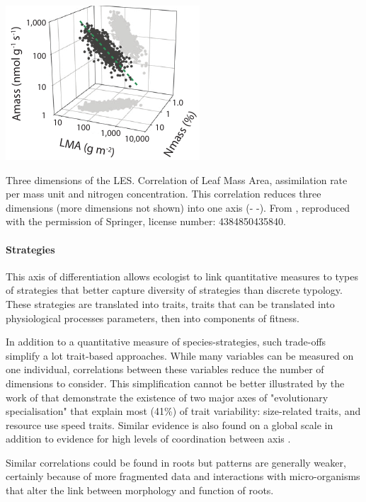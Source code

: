 \begin{marginfigure}
    \includegraphics{./Figures/LES1_m.pdf}
  \caption[Leaf Economic Spectrum]{Three dimensions of the LES. Correlation of Leaf Mass Area, assimilation rate per mass unit and nitrogen concentration. This correlation reduces three dimensions (more dimensions not shown) into one axis (\textcolor{myGreen}{- -}). From \cite{wright_worldwide_2004}, reproduced with the permission of Springer, license number: 4384850435840. }
  \label{fg:insurance}
\end{marginfigure}

\paragraph{Strategies}
This axis of differentiation allows ecologist to link quantitative measures to types of strategies that better capture diversity of strategies than discrete typology. These strategies are translated into traits, traits that can be translated into physiological processes parameters, then into components of fitness.

In addition to a quantitative measure of species-strategies, such trade-offs simplify a lot trait-based approaches. While many variables can be measured on one individual, correlations between these variables reduce the number of dimensions to consider. This simplification cannot be better illustrated by the work of \cite{diaz_plant_2004} that demonstrate the existence of two major axes of "evolutionary specialisation" that explain most (41\%) of trait variability: size-related traits, and resource use speed traits. Similar evidence is also found on a global scale in addition to evidence for high levels of coordination between axis \parencite{diaz_global_2016}.


Similar correlations could be found in roots \cite{ ryser_importance_1996, reich_world-wide_2014} but patterns are generally weaker, certainly because of more fragmented data and interactions with micro-organisms that alter the link between morphology and function of roots.

